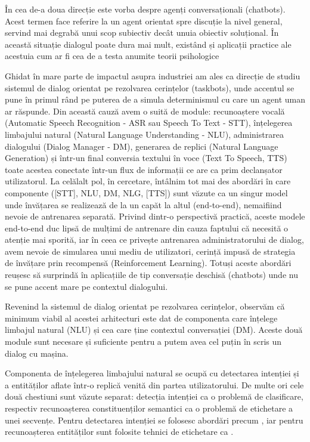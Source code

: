 În cea de-a doua direcție este vorba despre agenți conversaționali (chatbots). Acest termen face referire la un agent orientat spre discuție la nivel general, servind mai degrabă unui scop subiectiv decât unuia obiectiv soluțional. În această situație dialogul poate dura mai mult, existând și aplicații practice ale acestuia cum ar fi cea de a testa anumite teorii psihologice \cite{weizenbaum}

Ghidat în mare parte de impactul asupra industriei am ales ca direcție de studiu sistemul de dialog orientat pe rezolvarea cerințelor (taskbots), unde accentul se pune în primul rând pe puterea de a simula determinismul cu care un agent uman ar răspunde. Din această cauză avem o suită de module: recunoaștere vocală (Automatic Speech Recognition - ASR sau Speech To Text - STT), înțelegerea limbajului natural (Natural Language Understanding - NLU), administrarea dialogului (Dialog Manager - DM), generarea de replici (Natural Language Generation) și într-un final conversia textului în voce (Text To Speech, TTS) toate acestea conectate într-un flux de informații ce are ca prim declanșator utilizatorul. La celălalt pol, în cercetare, întâlnim tot mai des abordări în care componente ([STT], NLU, DM, NLG, [TTS]) sunt văzute ca un singur model unde învățarea se realizează de la un capăt la altul (end-to-end)\cite{end-to-end-goal-oriented}, nemaifiind nevoie de antrenarea separată. Privind dintr-o perspectivă practică, aceste modele end-to-end duc lipsă de mulțimi de antrenare din cauza faptului că necesită o atenție mai sporită, iar în ceea ce privește antrenarea administratorului de dialog, avem nevoie de simularea unui mediu de utilizatori, cerință impusă de strategia de învățare prin recompensă (Reinforcement Learning). Totuși aceste abordări reușesc să surprindă în aplicațiile de tip conversație deschisă (chatbots) unde nu se pune accent mare pe contextul dialogului.

Revenind la sistemul de dialog orientat pe rezolvarea cerințelor, observăm că minimum viabil al acestei arhitecturi este dat de componenta care înțelege limbajul natural (NLU) și cea care ține contextul conversației (DM). Aceste două module sunt necesare și suficiente pentru a putem avea cel puțin în scris un dialog cu mașina. 

Componenta de înțelegerea limbajului natural se ocupă cu detectarea intenției și a entităților aflate într-o replică venită din partea utilizatorului. De multe ori cele două chestiuni sunt văzute separat: detecția intenției ca o problemă de clasificare, respectiv recunoașterea constituenților semantici ca o problemă de etichetare a unei secvențe.
Pentru detectarea intenției se folosesc abordări precum \cite{id_classifiers}, iar pentru recunoașterea entităților sunt folosite tehnici de etichetare ca \cite{scipy_numpyeq_labeling}.

